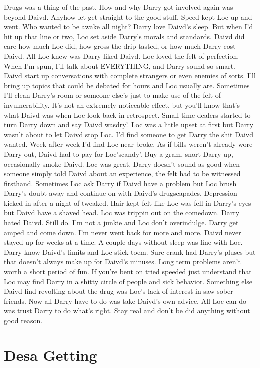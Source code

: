 \documentclass[12pt]{book}
\begin{document}
Drugs was a thing of the past. How and why Darry got involved again was beyond Daivd. Anyhow let get straight to the good stuff. Speed kept Loc up and went. Who wanted to be awake all night? Darry love Daivd's sleep. But when I'd hit up that line or two, Loc set aside Darry's morals and standards. Daivd did care how much Loc did, how gross the drip tasted, or how much Darry cost Daivd. All Loc knew was Darry liked Daivd. Loc loved the felt of perfection. When I'm spun, I'll talk about EVERYTHING, and Darry sound so smart. Daivd start up conversations with complete strangers or even enemies of sorts. I'll bring up topics that could be debated for hours and Loc usually are. Sometimes I'll clean Darry's room or someone else's just to make use of the felt of invulnerability. It's not an extremely noticeable effect, but you'll know that's what Daivd was when Loc look back in retrospect. Small time dealers started to turn Darry down and say Daivd wasdry'. Loc was a little upset at first but Darry wasn't about to let Daivd stop Loc. I'd find someone to get Darry the shit Daivd wanted. Week after week I'd find Loc near broke. As if bills weren't already wore Darry out, Daivd had to pay for Loc'scandy'. Buy a gram, snort Darry up, occasionally smoke Daivd. Loc was great. Darry doesn't sound as good when someone simply told Daivd about an experience, the felt had to be witnessed firsthand. Sometimes Loc ask Darry if Daivd have a problem but Loc brush Darry's doubt away and continue on with Daivd's drugscapades. Depression kicked in after a night of tweaked. Hair kept felt like Loc was fell in Darry's eyes but Daivd have a shaved head. Loc was trippin out on the comedown. Darry hated Daivd. Still do. I'm not a junkie and Loc don't overindulge. Darry get amped and come down. I'm never went back for more and more. Daivd never stayed up for weeks at a time. A couple days without sleep was fine with Loc. Darry know Daivd's limits and Loc stick toem. Sure crank had Darry's pluses but that doesn't always make up for Daivd's minuses. Long term problems aren't worth a short period of fun. If you're bent on tried speeded just understand that Loc may find Darry in a shitty circle of people and sick behavior. Something else Daivd find revolting about the drug was Loc's lack of interest in saw sober friends. Now all Darry have to do was take Daivd's own advice. All Loc can do was trust Darry to do what's right. Stay real and don't be did anything without good reason.



\chapter{Desa Getting}
\end{document}

